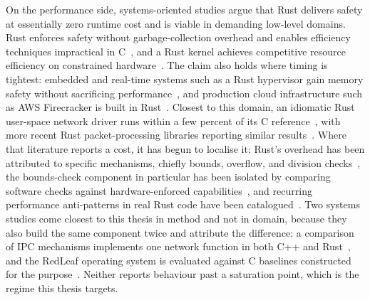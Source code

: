 \documentclass[english,twoside,openright,a4paper,censored,csm,software-track-2020]{HYthesisML}
\begin{document}
On the performance side, systems-oriented studies argue that Rust delivers safety at
essentially zero runtime cost and is viable in demanding low-level domains. Rust enforces
safety without garbage-collection overhead and enables efficiency techniques impractical in
C~\cite{balasubramanian2017rust}, and a Rust kernel achieves competitive resource efficiency on
constrained hardware~\cite{levy2017kernel}. The claim also holds where timing is tightest:
embedded and real-time systems such as a Rust hypervisor gain memory safety without sacrificing
performance~\cite{mo2023rustshyper}, and production cloud infrastructure such as AWS Firecracker
is built in Rust~\cite{agache2020firecracker}. Closest to this domain, an idiomatic Rust
user-space network driver runs within a few percent of its C
reference~\cite{emmerich2019drivers}, with more recent Rust packet-processing libraries
reporting similar results~\cite{xiao2024rpkt}. Where that literature reports a cost, it has
begun to localise
it: Rust's overhead has been attributed to specific mechanisms, chiefly bounds, overflow, and
division checks~\cite{zhang2022runtime}, the bounds-check component in particular has been
isolated by comparing software checks against hardware-enforced
capabilities~\cite{harris2023morello}, and recurring performance anti-patterns in real Rust
code have been catalogued~\cite{cui2025perfbugs}. Two systems studies come closest to this
thesis in method and not in domain, because they also build the same component twice and
attribute the difference: a comparison of IPC mechanisms implements one network function in
both C++ and Rust~\cite{li2021ipc}, and the RedLeaf operating system is evaluated against C
baselines constructed for the purpose~\cite{narayanan2020redleaf}. Neither reports behaviour
past a saturation point, which is the regime this thesis targets.
\end{document}
